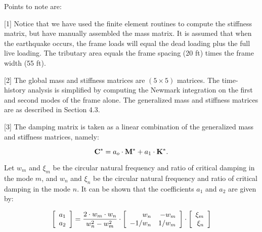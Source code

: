 \vspace{0.15 in}\noindent
Points to note are:

\vspace{0.10 in}
\begin{description}
\item{[1]}
Notice that we have used the finite element routines to
compute the stiffness matrix, but have manually assembled the mass matrix.
It is assumed that when the earthquake occurs, the frame loads will
equal the dead loading plus the full live loading.
The tributary area equals the frame spacing (20 ft)
times the frame width (55 ft).

\item{[2]}
The global mass and stiffness matrices are $(5 \times 5)$ matrices.
The time-history analysis is simplified by computing the Newmark
integration on the first and second modes of the frame alone.
The generalized mass and stiffness matrices are as described in Section 4.3.

\item{[3]}
The damping matrix is taken as a linear combination
of the generalized mass and stiffness matrices, namely:

\begin{equation}
{\bf C^*} = a_o \cdot {\bf M^*} + a_1 \cdot {\bf K^*}.
\label{eq: damping-part1}
\end{equation}

Let $w_m$ and $\xi_m$ be the circular natural frequency
and ratio of critical damping in the mode $m$,
and $w_n$ and $\xi_n$ be the circular natural frequency
and ratio of critical damping in the mode $n$.
It can be shown that the coefficients $a_1$ and $a_2$ are given by:

\begin{equation}
\left[
\begin{array}{r}
a_1 \\ a_2 \\
\end{array} \right] =
{{2 \cdot w_m \cdot w_n} \over {w_n^2 - w_m^2}} \cdot
\left[
\begin{array}{rr}
    {w_n}  &    -w_m   \\
{-1/{w_n}} & {1/{w_m}} \\
\end{array}
\right] \cdot \left[
\begin{array}{r}
\xi_m \\ \xi_n \\
\end{array}
\right]
\label{eq: damping-part2}
\end{equation}


\end{description}
